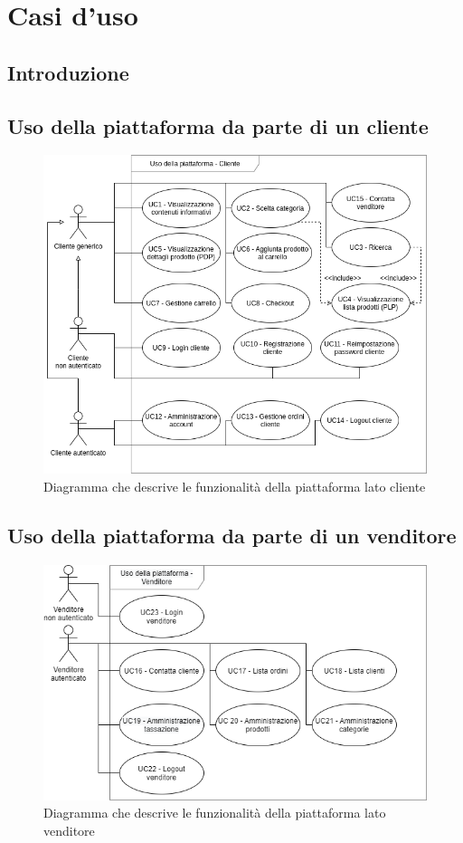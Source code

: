 \section{Casi d'uso}
\subsection{Introduzione}
\subsection{Uso della piattaforma da parte di un cliente}
\begin{figure}[H]
    \centering
    \includegraphics[width=\linewidth]{res/images/UC/cliente.png}
    \caption{Diagramma che descrive le funzionalità della piattaforma lato cliente}
\end{figure}
\subsection{Uso della piattaforma da parte di un venditore}
\begin{figure}[H]
    \centering
    \includegraphics[width=\linewidth]{res/images/UC/venditore.png}
    \caption{Diagramma che descrive le funzionalità della piattaforma lato venditore}
\end{figure}


